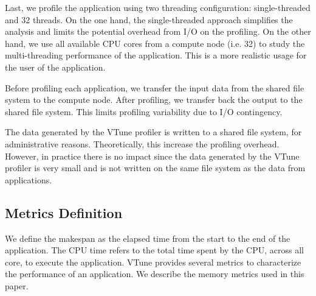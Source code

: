 \documentclass[conference]{IEEEtran}
\begin{document}
Last, we profile the application using two threading configuration: single-threaded and 32 threads. On the one hand, the single-threaded approach simplifies the analysis and limits the potential overhead from I/O on the profiling. 
On the other hand, we use all available CPU cores from a compute node (i.e. 32) to study the multi-threading performance of the application. This is a more realistic usage for the user of the application.
			
Before profiling each application, we transfer the input data from the shared file system to the compute node. After profiling, we transfer back the output to the shared file system. This limits profiling variability due to I/O contingency.
			
The data generated by the VTune profiler is written to a shared file system, for administrative reasons. Theoretically, this increase the profiling overhead. However, in practice there is no impact since the data generated by the VTune profiler is very small and is not written on the same file system as the data from applications.
			
\subsection{Metrics Definition}
We define the makespan as the elapsed time from the start to the end of the application. The CPU time refers to the total time spent by the CPU, across all core, to execute the application. VTune provides several metrics to characterize the performance of an application. We describe the memory metrics used in this paper.
			
\end{document}
